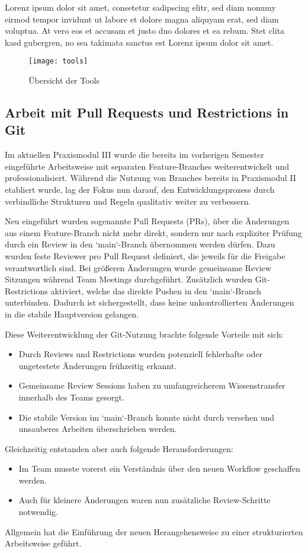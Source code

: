 Lorenz ipsum dolor sit amet, consetetur sadipscing elitr, sed diam nonumy eirmod tempor invidunt ut labore et dolore magna aliquyam erat, sed diam voluptua.
At vero eos et accusam et justo duo dolores et ea rebum.
Stet clita kasd gubergren, no sea takimata sanctus est Lorenz ipsum dolor sit amet.

\begin{figure}[H]
    \centering
    \texttt{[image: tools]}
    \caption{Übersicht der Tools}\label{fig:uebersicht-tools}
\end{figure}

\subsection{Arbeit mit Pull Requests und Restrictions in Git}\label{subsec:arbeit-mit-pull-requests-und-restrictions-in-git}

Im aktuellen Praxismodul III wurde die bereits im vorherigen Semester eingeführte Arbeitsweise mit separaten Feature-Branches weiterentwickelt und professionalisiert.
Während die Nutzung von Branches bereits in Praxismodul II etabliert wurde, lag der Fokus nun darauf, den Entwicklungsprozess durch verbindliche Strukturen und Regeln qualitativ weiter zu verbessern.

Neu eingeführt wurden sogenannte Pull Requests (PRs), über die Änderungen aus einem Feature-Branch nicht mehr direkt, sondern nur nach expliziter Prüfung durch ein Review in den `main`-Branch übernommen werden dürfen.
Dazu wurden feste Reviewer pro Pull Request definiert, die jeweils für die Freigabe verantwortlich sind.
Bei größeren Änderungen wurde gemeinsame Review Sitzungen während Team Meetings durchgeführt.
Zusätzlich wurden Git-Restrictions aktiviert, welche das direkte Pushen in den `main`-Branch unterbinden.
Dadurch ist sichergestellt, dass keine unkontrollierten Änderungen in die stabile Hauptversion gelangen.

Diese Weiterentwicklung der Git-Nutzung brachte folgende Vorteile mit sich:
\begin{itemize}
    \item Durch Reviews und Restrictions wurden potenziell fehlerhafte oder ungetestete Änderungen frühzeitig erkannt.
    \item Gemeinsame Review Sessions haben zu umfangreicherem Wissenstransfer innerhalb des Teams gesorgt.
    \item Die stabile Version im `main`-Branch konnte nicht durch versehen und unsauberes Arbeiten überschrieben werden.
\end{itemize}

Gleichzeitig entstanden aber auch folgende Herausforderungen:
\begin{itemize}
    \item Im Team musste vorerst ein Verständnis über den neuen Workflow geschaffen werden.
    \item Auch für kleinere Änderungen waren nun zusätzliche Review-Schritte notwendig.
\end{itemize}

Allgemein hat die Einführung der neuen Herangehensweise zu einer strukturierten Arbeitsweise geführt.
